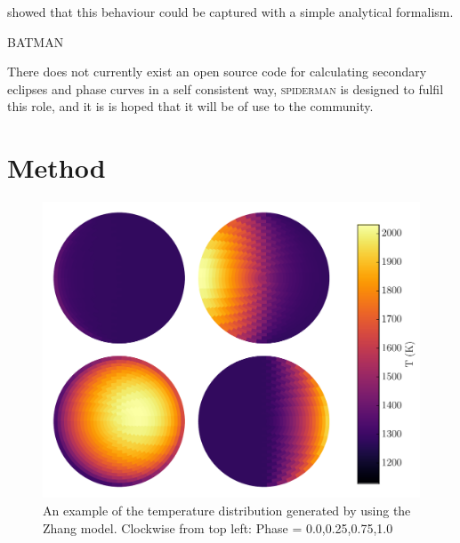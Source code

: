 \documentclass[a4paper,fleqn,usenatbib]{mnras}
\begin{document}
\citet{Zhang2016} showed that this behaviour could be captured with a simple analytical formalism.

BATMAN \citep{Kreidberg2015a}

There does not currently exist an open source code for calculating secondary eclipses and phase curves in a self consistent way, \textsc{spiderman} is designed to fulfil this role, and it is is hoped that it will be of use to the community.

\section{Method}\label{sec:method}

\begin{figure}
\begin{center}
\includegraphics[width=\columnwidth]{img/zhang_quad.pdf}
\caption{An example of the temperature distribution generated by using the Zhang model. Clockwise from top left: Phase = 0.0,0.25,0.75,1.0}
\label{fig:zhang_quad}
\end{center}
\end{figure}
\end{document}
